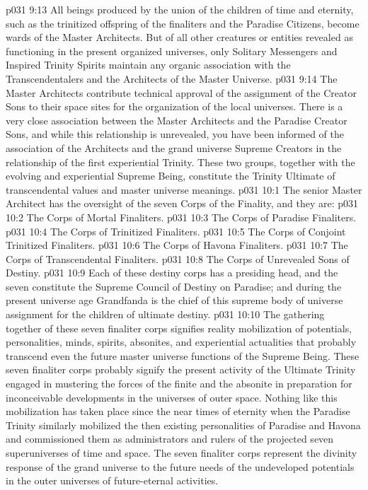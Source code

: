 \vs p031 9:13 All beings produced by the union of the children of time and eternity, such as the trinitized offspring of the finaliters and the Paradise Citizens, become wards of the Master Architects. But of all other creatures or entities revealed as functioning in the present organized universes, only Solitary Messengers and Inspired Trinity Spirits maintain any organic association with the Transcendentalers and the Architects of the Master Universe.
\vs p031 9:14 The Master Architects contribute technical approval of the assignment of the Creator Sons to their space sites for the organization of the local universes. There is a very close association between the Master Architects and the Paradise Creator Sons, and while this relationship is unrevealed, you have been informed of the association of the Architects and the grand universe Supreme Creators in the relationship of the first experiential Trinity. These two groups, together with the evolving and experiential Supreme Being, constitute the Trinity Ultimate of transcendental values and master universe meanings.
\vs p031 10:1 The senior Master Architect has the oversight of the seven Corps of the Finality, and they are:
\vs p031 10:2 \bibnobreakspace The Corps of Mortal Finaliters.
\vs p031 10:3 \bibnobreakspace The Corps of Paradise Finaliters.
\vs p031 10:4 \bibnobreakspace The Corps of Trinitized Finaliters.
\vs p031 10:5 \bibnobreakspace The Corps of Conjoint Trinitized Finaliters.
\vs p031 10:6 \bibnobreakspace The Corps of Havona Finaliters.
\vs p031 10:7 \bibnobreakspace The Corps of Transcendental Finaliters.
\vs p031 10:8 \bibnobreakspace The Corps of Unrevealed Sons of Destiny.
\vs p031 10:9 Each of these destiny corps has a presiding head, and the seven constitute the Supreme Council of Destiny on Paradise; and during the present universe age Grandfanda is the chief of this supreme body of universe assignment for the children of ultimate destiny.
\vs p031 10:10 The gathering together of these seven finaliter corps signifies reality mobilization of potentials, personalities, minds, spirits, absonites, and experiential actualities that probably transcend even the future master universe functions of the Supreme Being. These seven finaliter corps probably signify the present activity of the Ultimate Trinity engaged in mustering the forces of the finite and the absonite in preparation for inconceivable developments in the universes of outer space. Nothing like this mobilization has taken place since the near times of eternity when the Paradise Trinity similarly mobilized the then existing personalities of Paradise and Havona and commissioned them as administrators and rulers of the projected seven superuniverses of time and space. The seven finaliter corps represent the divinity response of the grand universe to the future needs of the undeveloped potentials in the outer universes of future\hyp{}eternal activities.
